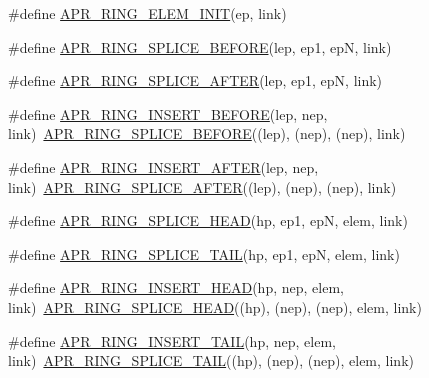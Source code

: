 \begin{DoxyCompactItemize}
\item 
\#define \mbox{\hyperlink{group__apr__ring_gae5048ecda4b26b012ee93c2c830058cb}{A\+P\+R\+\_\+\+R\+I\+N\+G\+\_\+\+E\+L\+E\+M\+\_\+\+I\+N\+IT}}(ep,  link)
\item 
\#define \mbox{\hyperlink{group__apr__ring_ga438e7369e650ee07ac98ed0731589750}{A\+P\+R\+\_\+\+R\+I\+N\+G\+\_\+\+S\+P\+L\+I\+C\+E\+\_\+\+B\+E\+F\+O\+RE}}(lep,  ep1,  epN,  link)
\item 
\#define \mbox{\hyperlink{group__apr__ring_ga53e6564eba59d7e734a0ce03cb418a42}{A\+P\+R\+\_\+\+R\+I\+N\+G\+\_\+\+S\+P\+L\+I\+C\+E\+\_\+\+A\+F\+T\+ER}}(lep,  ep1,  epN,  link)
\item 
\#define \mbox{\hyperlink{group__apr__ring_ga76f9a04f932b3377073fa4e30d745564}{A\+P\+R\+\_\+\+R\+I\+N\+G\+\_\+\+I\+N\+S\+E\+R\+T\+\_\+\+B\+E\+F\+O\+RE}}(lep,  nep,  link)~\mbox{\hyperlink{group__apr__ring_ga438e7369e650ee07ac98ed0731589750}{A\+P\+R\+\_\+\+R\+I\+N\+G\+\_\+\+S\+P\+L\+I\+C\+E\+\_\+\+B\+E\+F\+O\+RE}}((lep), (nep), (nep), link)
\item 
\#define \mbox{\hyperlink{group__apr__ring_ga40453637d00c853f3a212a30c1f2cb41}{A\+P\+R\+\_\+\+R\+I\+N\+G\+\_\+\+I\+N\+S\+E\+R\+T\+\_\+\+A\+F\+T\+ER}}(lep,  nep,  link)~\mbox{\hyperlink{group__apr__ring_ga53e6564eba59d7e734a0ce03cb418a42}{A\+P\+R\+\_\+\+R\+I\+N\+G\+\_\+\+S\+P\+L\+I\+C\+E\+\_\+\+A\+F\+T\+ER}}((lep), (nep), (nep), link)
\item 
\#define \mbox{\hyperlink{group__apr__ring_ga592e71a7cf219fc70f4fc47c60ef4c64}{A\+P\+R\+\_\+\+R\+I\+N\+G\+\_\+\+S\+P\+L\+I\+C\+E\+\_\+\+H\+E\+AD}}(hp,  ep1,  epN,  elem,  link)
\item 
\#define \mbox{\hyperlink{group__apr__ring_ga51e02e214fb6e218f45ff23cbd1f7abc}{A\+P\+R\+\_\+\+R\+I\+N\+G\+\_\+\+S\+P\+L\+I\+C\+E\+\_\+\+T\+A\+IL}}(hp,  ep1,  epN,  elem,  link)
\item 
\#define \mbox{\hyperlink{group__apr__ring_gad59352546dc9253c0057ad43cf728a63}{A\+P\+R\+\_\+\+R\+I\+N\+G\+\_\+\+I\+N\+S\+E\+R\+T\+\_\+\+H\+E\+AD}}(hp,  nep,  elem,  link)~\mbox{\hyperlink{group__apr__ring_ga592e71a7cf219fc70f4fc47c60ef4c64}{A\+P\+R\+\_\+\+R\+I\+N\+G\+\_\+\+S\+P\+L\+I\+C\+E\+\_\+\+H\+E\+AD}}((hp), (nep), (nep), elem, link)
\item 
\#define \mbox{\hyperlink{group__apr__ring_ga235311035184125d72ce0689c9949a3e}{A\+P\+R\+\_\+\+R\+I\+N\+G\+\_\+\+I\+N\+S\+E\+R\+T\+\_\+\+T\+A\+IL}}(hp,  nep,  elem,  link)~\mbox{\hyperlink{group__apr__ring_ga51e02e214fb6e218f45ff23cbd1f7abc}{A\+P\+R\+\_\+\+R\+I\+N\+G\+\_\+\+S\+P\+L\+I\+C\+E\+\_\+\+T\+A\+IL}}((hp), (nep), (nep), elem, link)

\end{DoxyCompactItemize}
